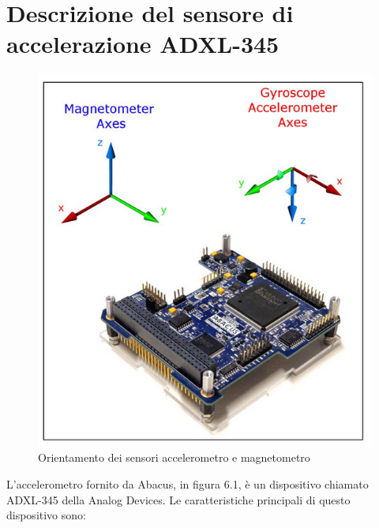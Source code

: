 \documentclass[LaM,binding=0.6cm]{../sapthesis}
\begin{document}
\section{Descrizione del sensore di accelerazione ADXL-345}
\begin{figure}[htbp]
\centerline{\includegraphics[scale=0.5]{examples/AbacusAccelerometer.PNG}}
\caption{Orientamento dei sensori accelerometro e magnetometro}
\label{fig}
\end{figure}
\vspace{0.5cm}
L’accelerometro fornito da Abacus, in figura 6.1, è un dispositivo chiamato ADXL-345 della Analog Devices.
Le caratteristiche principali di questo dispositivo sono:
\end{document}
